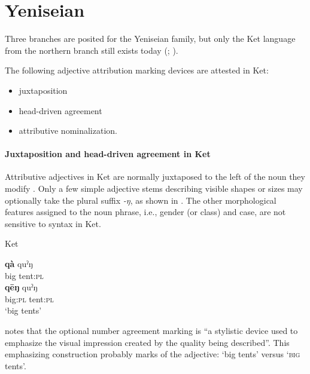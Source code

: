 \section{Yeniseian}
\label{yeniseian synchr}
Three branches are posited for the Yeniseian family, but only the Ket language from the northern branch still exists today (\citealt{werner1997a}; \citealt[223]{salminen2007}).

The following adjective attribution marking devices are attested in Ket:
\begin{itemize}
\item juxtaposition
\item head\hyp{}driven agreement
\item attributive nominalization.
\end{itemize}

\paragraph*{Juxtaposition and head\hyp{}driven agreement in Ket}
Attributive adjectives in Ket are normally juxtaposed to the left of the noun they modify \citep[38]{vajda2004}. Only a few simple adjective stems describing visible shapes or sizes may optionally take the plural suffix \textit{-ŋ}, as shown in . The other morphological features assigned to the noun phrase, i.e., gender (or class) and case, are not sensitive to syntax in Ket.
\begin{exe}
\ex 
\label{ket agr}
{\rm Ket \citep[38]{vajda2004}} 
\begin{xlist}
\ex	
\gll	\textbf{qà} quˀŋ\\
	big tent:\textsc{pl}\\
\ex	
\gll	\textbf{qēŋ} quˀŋ\\
	big:\textsc{pl} tent:\textsc{pl}\\
\glt	‘big tents’
\end{xlist}
\end{exe}
\citet[38]{vajda2004} notes that the optional number agreement marking is “a stylistic device used to emphasize the visual impression created by the quality being described”. This emphasizing construction probably marks  of the adjective: ‘big tents’ versus ‘\textsc{big} tents’.

